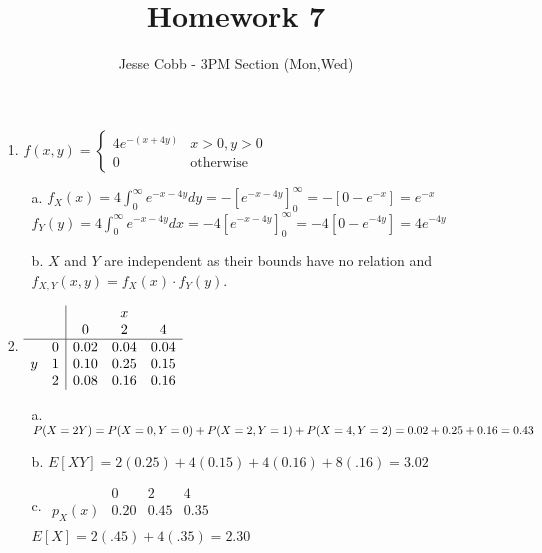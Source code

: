 \documentclass[11pt]{amsart}
\theoremstyle{definition}
\begin{document}
\title{Homework 7}

\author{Jesse Cobb - 3PM Section (Mon,Wed)}

\maketitle

\begin{itemize}

\item[1.] $f(x,y)=\begin{cases}
    4e^{-(x+4y)} &x>0,y>0 \\
    0 &\text{otherwise}
\end{cases}$
\begin{itemize}
    \item[a.] $f_X(x)=4\int_0^\infty e^{-x-4y}dy=-[e^{-x-4y}]_0^\infty=-[0-e^{-x}]=e^{-x}$\\
              $f_Y(y)=4\int_0^\infty e^{-x-4y}dx=-4[e^{-x-4y}]_0^\infty=-4[0-e^{-4y}]=4e^{-4y}$

    \item[b.] $X$ and $Y$ are independent as their bounds have no relation and $f_{X,Y}(x,y)=f_X(x)\cdot f_Y(y)$.
    
\end{itemize}

\item[2.]
$\begin{array}{cc|ccc}
  &   &      & x    &      \\
  &   & 0    & 2    & 4    \\\hline
  & 0 & 0.02 & 0.04 & 0.04 \\
y & 1 & 0.10 & 0.25 & 0.15 \\
  & 2 & 0.08 & 0.16 & 0.16
\end{array}$
\begin{itemize}
    \item[a.] $P(X=2Y)=P(X=0,Y=0)+P(X=2,Y=1)+P(X=4,Y=2)\\
              =0.02+0.25+0.16=0.43$

    \item[b.] $E[XY]=2(0.25)+4(0.15)+4(0.16)+8(.16)=3.02$

    \item[c.] 
$\begin{array}{c|ccc}
        & 0    & 2    & 4    \\\hline
p_X(x)  & 0.20 & 0.45 & 0.35 \\
\end{array}$\\
$E[X]=2(.45)+4(.35)=2.30$
    

\end{itemize}
\end{itemize}
\end{document}
